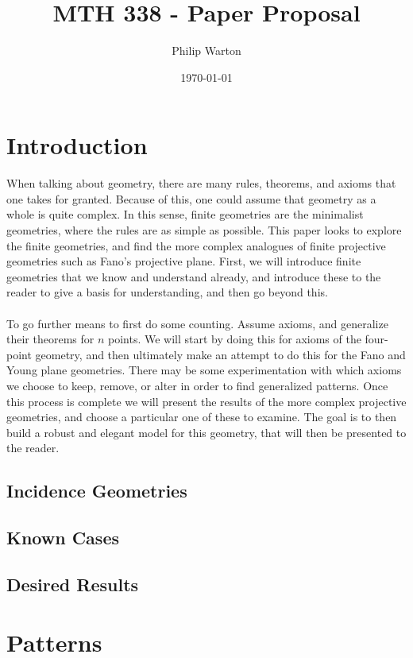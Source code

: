 \documentclass{article}
\begin{document}
\title{MTH 338 - Paper Proposal}
\author{Philip Warton}
\date{\today}
\maketitle

\section{Introduction}

When talking about geometry, there are many rules, theorems, and axioms that one takes for granted. Because of this, one could assume that geometry as a whole is quite complex. In this sense, finite geometries are the minimalist geometries, where the rules are as simple as possible. This paper looks to explore the finite geometries, and find the more complex analogues of finite projective geometries such as Fano's projective plane. First, we will introduce finite geometries that we know and understand already, and introduce these to the reader to give a basis for understanding, and then go beyond this. \\\\
To go further means to first do some counting. Assume axioms, and generalize their theorems for $n$ points. We will start by doing this for axioms of the four-point geometry, and then ultimately make an attempt to do this for the Fano and Young plane geometries. There may be some experimentation with which axioms we choose to keep, remove, or alter in order to find generalized patterns. Once this process is complete we will present the results of the more complex projective geometries, and choose a particular one of these to examine. The goal is to then build a robust and elegant model for this geometry, that will then be presented to the reader.

\clearpage

\subsection{Incidence Geometries}
\subsection{Known Cases}
\subsection{Desired Results}

\section{Patterns}
\end{document}
